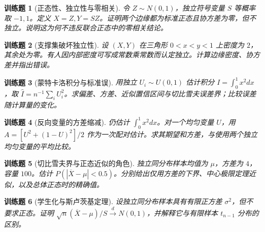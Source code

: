 \documentclass[UTF8,12pt,a4paper,fontset=fandol]{ctexbook}
\newtheorem{exercise}{训练题}[section]
\begin{document}
\begin{exercise}[正态性、独立性与零相关]\label{q:B17.15}
令 $Z\sim N(0,1)$，独立符号变量 $S$ 等概率取 $-1,1$。定义 $X=Z,Y=SZ$。证明两个边缘都为标准正态且协方差为零，但不独立。说明这为何不违反联合正态中的零相关结论。\par{}\end{exercise}

\begin{exercise}[支撑集破坏独立性]\label{q:B17.16}
设 $(X,Y)$ 在三角形 $0<x<y<1$ 上密度为 $2$，其余处为零。有人因内部密度可写成常数乘常数而认定独立。计算边缘密度、协方差并指出错误。\par{}\end{exercise}

\begin{exercise}[蒙特卡洛积分与标准误]\label{q:B17.17}
用独立 $U_i\sim U(0,1)$ 估计积分 $I=\int_0^1x^2dx$，取 $\widehat I=n^{-1}\sum_iU_i^2$。求偏差、方差、近似置信区间与切比雪夫误差界；比较误差随计算量的变化。\par{}\end{exercise}

\begin{exercise}[反向变量的方差缩减]\label{q:B17.18}
仍估计 $\int_0^1x^2dx$。对一个均匀变量 $U$，用 $A=[U^2+(1-U)^2]/2$ 作为一次配对估计。求其期望和方差，与使用两个独立均匀变量的平均比较。\par{}\end{exercise}

\begin{exercise}[切比雪夫界与正态近似的角色]\label{q:B17.19}
独立同分布样本均值为 $\mu$，方差为 $4$，容量 $100$。估计 $P(|\overline X-\mu|<0.5)$。分别给出仅用方差的下界、中心极限定理近似，以及总体正态时的精确值。\par{}\end{exercise}

\begin{exercise}[学生化与斯卢茨基定理]\label{q:B17.20}
设独立同分布样本具有有限正方差 $\sigma^2$，但不要求正态。证明 $\sqrt n(\overline X-\mu)/S\xrightarrow dN(0,1)$，并解释它与有限样本 $t_{n-1}$ 分布的区别。\par{}\end{exercise}
\end{document}
